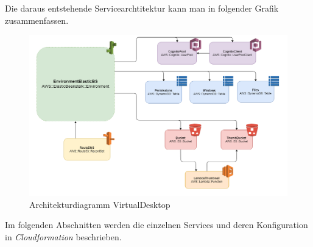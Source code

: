 \documentclass[a4paper, 12pt]{scrreprt}
\renewcommand\_{\textunderscore\allowbreak}
\begin{document}
\newpage
\noindent Die daraus entstehende Servicearchtitektur kann man in folgender Grafik zusammenfassen.

\begin{figure}[H]
\centering
\includegraphics[scale=0.4]{ArchiDiagram.png} 
\caption{Architekturdiagramm VirtualDesktop}
\end{figure}

\noindent Im folgenden Abschnitten werden die einzelnen Services und deren Konfiguration in \textit{Cloudformation} beschrieben. 
\end{document}
